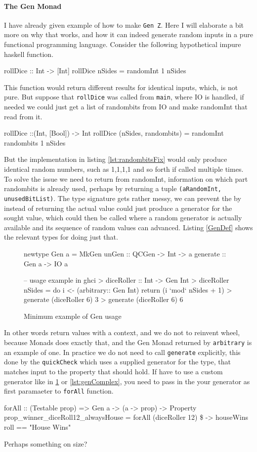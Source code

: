 \paragraph{The Gen Monad}
I have already given example of how to make \verb|Gen Z|. Here I will elaborate a bit more on why that works, and how it can indeed generate random inputs in a pure functional programming language.
Consider the following hypothetical impure haskell function.
\begin{hscode}
    rollDice :: Int -> [Int]
    rollDice nSides = 
         randomInt 1 nSides
\end{hscode}
This function would return different results for identical inputs, which, is not pure. But suppose that \verb|rollDice| was called from \verb|main|, where IO is handled, if needed we could just get a list of randombits from IO and make randomInt that read from it.
\begin{hscode}
    rollDice ::(Int, [Bool]) -> Int
    rollDice (nSides, randombits) = 
         randomInt randombits 1 nSides
\end{hscode}
But the implementation in listing \ref{lst:randombitsFix} would only produce identical random numbers, such as 1,1,1,1 and so forth if called multiple times. To solve the issue we need to return from randomInt, information on which part randombits is already used, perhaps by returning a tuple \verb|(aRandomInt, unusedBitList)|. The type signature gets rather messy, we can prevent the by instead of returning the actual value could just produce a generator for the sought value, which could then be called where a random generator is actually available and its sequence of random values can advanced. Listing \ref{GenDef} shows the relevant types for doing just that. 
\begin{figure}
    \centering
    \begin{hscode}
    newtype Gen a = MkGen {
        unGen :: QCGen -> Int -> a
    }
    generate :: Gen a -> IO a
    
    -- usage example in ghci
    > diceRoller :: Int -> Gen Int
    > diceRoller nSides = do 
        i <- (arbitrary:: Gen Int) 
        return (i `mod` nSides + 1)
    > generate (diceRoller 6)
    3
    > generate (diceRoller 6)
    6
    \end{hscode}
    \caption{Minimum example of Gen usage}
    \label{lst:GenDef}
\end{figure}
In other words return values with a context, and we do not to reinvent wheel, because Monads does exactly that, and the Gen Monad returned by \verb|arbitrary| is an example of one.
In practice we do not need to call \verb|generate| explicitly, this done by the \verb|quickCheck| which uses a supplied generator for the type, that matches input to the property that should hold. If have to use a custom generator like in \ref{lst:GenDef} or \ref{lst:genComplex}, you need to pass in the your generator as first paramaeter to \verb|forAll| function.
\begin{hscode}
    forAll :: (Testable prop) => Gen a -> (a -> prop) -> Property
    prop_winner_diceRoll12_alwaysHouse = 
        forAll (diceRoller 12) \$ \roll -> houseWins roll == "House Wins"
\end{hscode}
Perhaps something on size?

